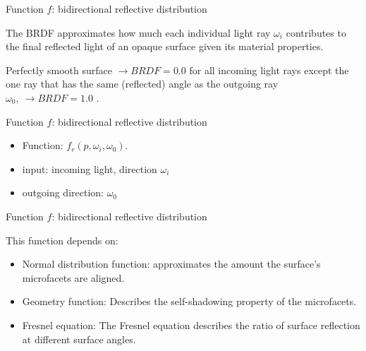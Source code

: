 \documentclass[]{beamer}
\begin{document}
\begin{frame}
  \textcolor{mypink1}{Function $f$: bidirectional reflective distribution} 
  \vspace{7mm}

  \pause
  The BRDF approximates how much each individual light ray 
  $\omega_i$ contributes to the final reflected light of an opaque surface given its material properties. 
  \vspace{5mm}


  \pause
\vspace{5mm}

  Perfectly smooth surface \pause $\rightarrow  BRDF = 0.0$ for  all incoming light rays   except the one ray that has the same (reflected) angle as the outgoing ray   $\omega_0,~\rightarrow BRDF=1.0$ .


  
  
\end{frame}





\begin{frame}
  \textcolor{mypink1}{Function $f$: bidirectional reflective distribution} 
  \vspace{7mm}



\begin{itemize}
  \item Function: $f_r(p,\omega_i,\omega_0)$.\pause
  \item input: incoming light, direction $\omega_i$ \pause
  \item outgoing direction: $\omega_0$ \pause
\end{itemize}

  
  
\end{frame}



\begin{frame}
  \textcolor{mypink1}{Function $f$: bidirectional reflective distribution} 
  \vspace{7mm}

This function depends on:\pause
\begin{itemize}
  \item Normal distribution function: approximates the amount the surface's microfacets are aligned.\pause
  \item Geometry function: Describes the self-shadowing property of the microfacets. \pause
  \item Fresnel equation: The Fresnel equation describes the ratio of surface reflection at different surface angles.\pause
\end{itemize}
  
  
\end{frame}
\end{document}
